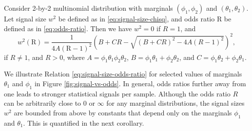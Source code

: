 \begin{proposition} \label{prop:signal-size-odds-ratio}
Consider 2-by-2 multinomial distribution with marginals $(\phi_1, \phi_2)$ and $(\theta_1, \theta_2)$.
Let signal size $w^2$ be defined as in \eqref{eq:signal-size-chisq}, and odds ratio $\text{R}$ be defined as in \eqref{eq:odds-ratio}. 
Then we have $w^2 = 0$ if $R=1$, and
\begin{equation} \label{eq:signal-size-odds-ratio}
    w^2(\text{R}) =
    \frac{1}{4A(\text{R}-1)^2}\left(B+CR-\sqrt{(B+CR)^2-4A(R-1)^2}\right)^2,
\end{equation}
if $R\neq1$, and $R>0$, 
where $A = \phi_1\theta_1\phi_2\theta_2$, $B = \phi_1\theta_1+\phi_2\theta_2$, and $C = \phi_1\theta_2+\phi_2\theta_1$.
\end{proposition}

We illustrate Relation \eqref{eq:signal-size-odds-ratio} for selected values of marginals $\theta_1$ and $\phi_1$ in Figure \ref{fig:signal-vs-odds}.
In general, odds ratios further away from one leads to stronger statistical signals per sample.
Although the odds ratio $R$ can be arbitrarily close to 0 or $\infty$ for any marginal distributions, the signal sizes $w^2$ are bounded from above by constants that depend only on the marginals $\phi_1$ and $\theta_1$.
This is quantified in the next corollary.

